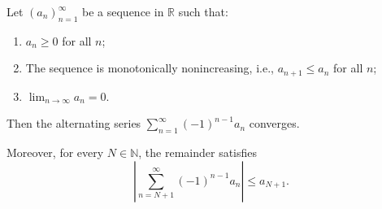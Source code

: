 \begin{theorem} \label{theorem:alternating_series_test_for_decreasing_magnitude_terms}
    Let $(a_n)_{n=1}^\infty$ be a sequence in $\mathbb{R}$ such that:
    \begin{enumerate}
        \item $a_n \geq 0$ for all $n$;
        \item The sequence is monotonically nonincreasing, i.e., $a_{n+1} \leq a_n$ for all $n$;
        \item $\lim_{n \to \infty} a_n = 0$.
    \end{enumerate}
    Then the alternating series $\sum_{n=1}^\infty (-1)^{n-1} a_n$ converges.

    Moreover, for every $N \in \mathbb{N}$, the remainder satisfies
    $$\left| \sum_{n=N+1}^\infty (-1)^{n-1} a_n \right| \leq a_{N+1}.$$
\end{theorem}
